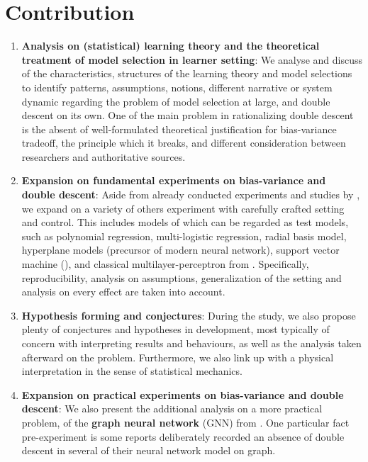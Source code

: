 \documentclass{article}
\begin{document}
\section{Contribution}
\begin{enumerate}[topsep=1pt,itemsep=0.6pt,leftmargin=*]
  \item \textbf{Analysis on (statistical) learning theory and the theoretical treatment of model selection in learner setting}: We analyse and discuss of the characteristics, structures of the learning theory and model selections to identify patterns, assumptions, notions, different narrative or system dynamic regarding the problem of model selection at large, and double descent on its own. One of the main problem in rationalizing double descent is the absent of well-formulated theoretical justification for bias-variance tradeoff, the principle which it breaks, and different consideration between researchers and authoritative sources. 
  \item \textbf{Expansion on fundamental experiments on bias-variance and double descent}: Aside from already conducted experiments and studies by \cite{sharma_bias-variance_2014,schaeffer_double_2023,nakkiran_deep_2019,belkin_reconciling_2019,6797087,unified_bias_composition,Scott_Fortmann_Bias,neal2019biasvariancetradeofftextbooksneed}, we expand on a variety of others experiment with carefully crafted setting and control. This includes models of which can be regarded as test models, such as polynomial regression, multi-logistic regression, radial basis model, hyperplane models (precursor of modern neural network), support vector machine (\cite{Cristianini2000AnIT}), and classical multilayer-perceptron from \cite{goodfellow2016deep}. Specifically, reproducibility, analysis on assumptions, generalization of the setting and analysis on every effect are taken into account. 
  \item \textbf{Hypothesis forming and conjectures}: During the study, we also propose plenty of conjectures and hypotheses in development, most typically of concern with interpreting results and behaviours, as well as the analysis taken afterward on the problem. Furthermore, we also link up with a physical interpretation in the sense of statistical mechanics. 
  \item \textbf{Expansion on practical experiments on bias-variance and double descent}: We also present the additional analysis on a more practical problem, of the \textbf{graph neural network} (GNN) from \cite{GRP_Hamilton,Scar04,lopushanskyy2024graphneuralnetworksgraph,tanis2024introductiongraphneuralnetworks,bronstein2021geometricdeeplearninggrids,Veli_kovi__2023}. One particular fact pre-experiment is some reports deliberately recorded an absence of double descent in several of their neural network model on graph. 
\end{enumerate}
\end{document}
